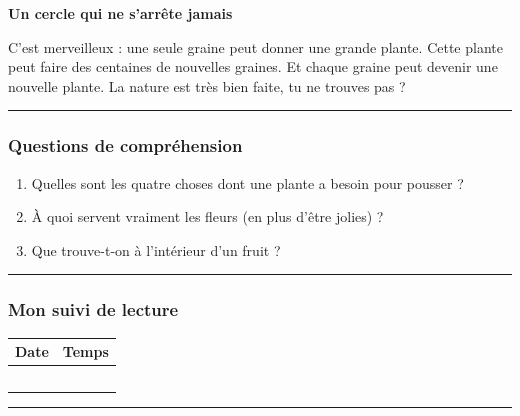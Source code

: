 \documentclass[
  french,
  14pt,
  a4paper,
]{extarticle}
\providecommand{\tightlist}{%
  \setlength{\itemsep}{0pt}\setlength{\parskip}{0pt}}
\begin{document}
\textbf{Un cercle qui ne s'arrête jamais}

C'est merveilleux : une seule graine peut donner une grande plante.
Cette plante peut faire des centaines de nouvelles graines. Et chaque
graine peut devenir une nouvelle plante. La nature est très bien faite,
tu ne trouves pas ?

\begin{center}\rule{0.5\linewidth}{0.5pt}\end{center}

\subsubsection{Questions de
compréhension}\label{questions-de-compruxe9hension-10}

\begin{enumerate}
\def\labelenumi{\arabic{enumi}.}
\tightlist
\item
  Quelles sont les quatre choses dont une plante a besoin pour pousser ?
\item
  À quoi servent vraiment les fleurs (en plus d'être jolies) ?
\item
  Que trouve-t-on à l'intérieur d'un fruit ?
\end{enumerate}

\begin{center}\rule{0.5\linewidth}{0.5pt}\end{center}

\subsubsection{Mon suivi de lecture}\label{mon-suivi-de-lecture-10}

\begin{center}
\begin{tabularx}{0.75\textwidth}{|X|X|}
\hline
\textbf{Date} & \textbf{Temps} \\
\hline
& \\
\hline
& \\
\hline
& \\
\hline
& \\
\hline
& \\
\hline
\end{tabularx}
\end{center}

\begin{center}\rule{0.5\linewidth}{0.5pt}\end{center}

\newpage
\end{document}
